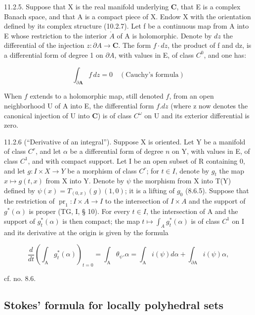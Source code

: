 11.2.5. Suppose that X is the real manifold underlying \(\mathbf{C}\), that E is a complex Banach space, and that A is a compact piece of X. Endow X with the orientation defined by its complex structure (10.2.7). Let f be a continuous map from A into E whose restriction to the interior \(\mathring{A}\) of A is holomorphic. Denote by \(dz\) the differential of the injection \(z\colon\partial A\to\mathbf{C}\). The form \(f\cdot dz\), the product of f and dz, is a differential form of degree 1 on \(\partial A\), with values in E, of class \(C^{0}\), and one has:

\[
\int_ {\partial \mathbf {A}} f\, d z = 0 \quad (\text{Cauchy's formula})
\]

When \(f\) extends to a holomorphic map, still denoted \(f\), from an open neighborhood U of A into E, the differential form \(f.dz\) (where z now denotes the canonical injection of U into \(\mathbf{C}\)) is of class \(C^{\omega}\) on U and its exterior differential is zero.

11.2.6 (“Derivative of an integral”). Suppose X is oriented. Let Y be a manifold of class \(C^{r}\), and let \(\alpha\) be a differential form of degree \(n\) on Y, with values in E, of class \(C^{1}\), and with compact support. Let I be an open subset of R containing 0, and let \(g: I \times X \to Y\) be a morphism of class \(C^{r}\); for \(t \in I\), denote by \(g_{t}\) the map \(x \mapsto g(t, x)\) from X into Y. Denote by \(\psi\) the morphism from X into T(Y) defined by \(\psi(x) = T_{(0,x)}(g)(1,0)\); it is a lifting of \(g_{0}\) (8.6.5). Suppose that the restriction of \(\operatorname{pr}_{1}\colon I\times A\to I\) to the intersection of \(I\times A\) and the support of \(g^{*}(\alpha)\) is proper (TG, I, § 10). For every \(t \in I\), the intersection of A and the support of \(g_{t}^{*}(\alpha)\) is then compact; the map \(t \mapsto \int_{A} g_{t}^{*}(\alpha)\) is of class \(C^{1}\) on I and its derivative at the origin is given by the formula

\[
\frac {d}{d t} \left(\int_ {\mathrm{A}} g _ {t} ^ {*} (\alpha)\right) _ {t = 0} = \int_ {\mathrm{A}} \theta_ {\psi}. \alpha = \int_ {\mathrm{A}} i (\psi) d \alpha + \int_ {\partial \mathrm{A}} i (\psi) \alpha ,
\]

cf. no. 8.6.

\subsection{Stokes' formula for locally polyhedral sets}

